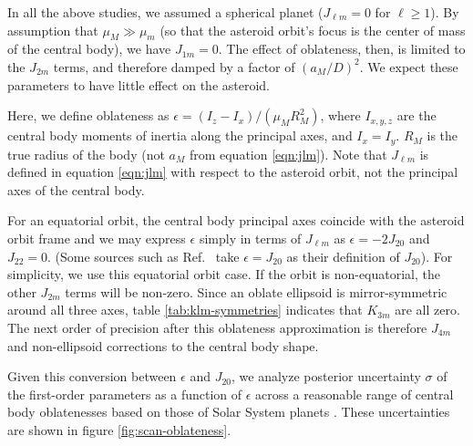 \documentclass[fleqn,usenatbib]{mnras}
\begin{document}
In all the above studies, we assumed a spherical planet ($J_{\ell m} = 0$ for $\ell \geq 1$). By assumption that $\mu_M \gg \mu_m$ (so that the asteroid orbit's focus is the center of mass of the central body), we have $J_{1m} = 0$. The effect of oblateness, then, is limited to the $J_{2m}$ terms, and therefore damped by a factor of $(a_M / D)^2$. We expect these parameters to have little effect on the asteroid.

Here, we define oblateness as $\epsilon = (I_z - I_x)/(\mu_M R_M^2)$, where $I_{x,y,z}$ are the central body moments of inertia along the principal axes, and $I_x = I_y$. $R_M$ is the true radius of the body (not $a_M$ from equation \ref{eqn:jlm}). Note that $J_{\ell m}$ is defined in equation \ref{eqn:jlm} with respect to the asteroid orbit, not the principal axes of the central body.

For an equatorial orbit, the central body principal axes coincide with the asteroid orbit frame and we may express $\epsilon$ simply in terms of $J_{\ell m}$ as $\epsilon = -2J_{20}$ and $J_{22} = 0$. (Some sources such as Ref.~\cite{paterLissauer2015} take $\epsilon=J_{20}$ as their definition of $J_{20}$). For simplicity, we use this equatorial orbit case. If the orbit is non-equatorial, the other $J_{2m}$ terms will be non-zero. Since an oblate ellipsoid is mirror-symmetric around all three axes, table \ref{tab:klm-symmetries} indicates that $K_{3m}$ are all zero. The next order of precision after this oblateness approximation is therefore $J_{4m}$ and  non-ellipsoid corrections to the central body shape.

Given this conversion between $\epsilon$ and $J_{20}$, we analyze posterior uncertainty $\sigma$ of the first-order parameters as a function of $\epsilon$ across a reasonable range of central body oblatenesses based on those of Solar System planets \cite{paterLissauer2015}. These uncertainties are shown in figure \ref{fig:scan-oblateness}.
\end{document}
